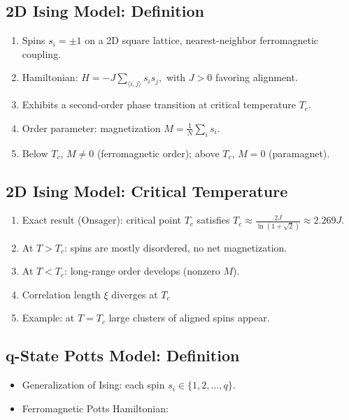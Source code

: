 \documentclass[%
oneside,                 %
final,                   %
10pt]{article}
\begin{document}
\subsection{2D Ising Model: Definition}
\begin{enumerate}
\item Spins $s_i = \pm 1$ on a 2D square lattice, nearest-neighbor ferromagnetic coupling.

\item Hamiltonian: $H = -J \sum_{\langle i,j\rangle} s_i s_j,$ with $J>0$ favoring alignment.

\item Exhibits a second-order phase transition at critical temperature $T_c$.

\item Order parameter: magnetization $M = \frac{1}{N}\sum_i s_i$.

\item Below $T_c$, $M\neq0$ (ferromagnetic order); above $T_c$, $M=0$ (paramagnet).
\end{enumerate}

\noindent
\subsection{2D Ising Model: Critical Temperature}
\begin{enumerate}
\item Exact result (Onsager): critical point $T_c$ satisfies $T_c \approx \frac{2J}{\ln(1+\sqrt{2})}\approx 2.269J$.

\item At $T>T_c$: spins are mostly disordered, no net magnetization.

\item At $T<T_c$: long-range order develops (nonzero $M$).

\item Correlation length $\xi$ diverges at $T_c$ 

\item Example: at $T=T_c$ large clusters of aligned spins appear.
\end{enumerate}

\noindent
\subsection{q-State Potts Model: Definition}
\begin{itemize}
\item Generalization of Ising: each spin $s_i \in \{1,2,\dots,q\}$.

\item Ferromagnetic Potts Hamiltonian:
\end{itemize}
\end{document}
